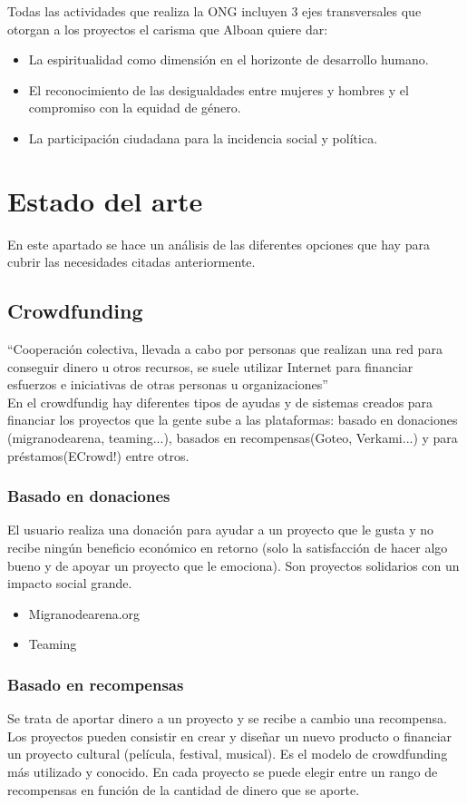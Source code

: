 Todas las actividades que realiza la ONG incluyen 3 ejes transversales que otorgan a los proyectos el carisma que Alboan quiere dar:
\begin{itemize}
	\item La espiritualidad como dimensión en el horizonte de desarrollo humano.
	\item El reconocimiento de las desigualdades entre mujeres y hombres y el compromiso con la equidad de género.
	\item La participación ciudadana para la incidencia social y política.
\end{itemize}

\section{Estado del arte}
En este apartado se hace un análisis de las diferentes opciones que hay para cubrir las necesidades citadas anteriormente.
\subsection{Crowdfunding}
“Cooperación colectiva, llevada a cabo por personas que realizan una red para conseguir dinero u otros recursos, se suele utilizar Internet para financiar esfuerzos e iniciativas de otras personas u organizaciones”\cite{crowd}\\

En el crowdfundig hay diferentes tipos de ayudas y de sistemas creados para financiar los proyectos que la gente sube a las plataformas: basado en donaciones (migranodearena, teaming...), basados en recompensas(Goteo, Verkami...) y para préstamos(ECrowd!) entre otros.

\subsubsection{Basado en donaciones}
El usuario realiza una donación para ayudar a un proyecto que le gusta y no recibe ningún beneficio económico en retorno (solo la satisfacción de hacer algo bueno y de apoyar un proyecto que le emociona). Son proyectos solidarios con un impacto social grande.
\begin{itemize}
	\item Migranodearena.org
	\item Teaming
\end{itemize}

\subsubsection{Basado en recompensas}
Se trata de aportar dinero a un proyecto y se recibe a cambio una recompensa. Los proyectos pueden consistir en crear y diseñar un nuevo producto o financiar un proyecto cultural (película, festival, musical). Es el modelo de crowdfunding más utilizado y conocido. En cada proyecto se puede elegir entre un rango de recompensas en función de la cantidad de dinero que se aporte.
	
